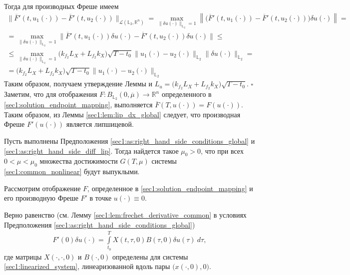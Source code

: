 \documentclass[../main.tex]{subfiles}
\begin{document}
Тогда для производных Фреше имеем
\begin{gather*}
	 \Big\| \overline{F}'(t, u_1(\cdot)) - \overline{F}'(t, u_2(\cdot)) \Big\|_{\mathcal{L}(\mathbb{L}_2, \mathbb{R}^n)} = 
	 \max\limits_{\|\delta u(\cdot)\|_{\mathbb{L}_2} = 1} \left\| \Big(  \overline{F}'(t, u_1(\cdot)) - \overline{F}'(t, u_2(\cdot)) \Big) \delta u(\cdot) \right\| = \\ =
	  \max\limits_{\|\delta u(\cdot)\|_{\mathbb{L}_2} = 1} \Big\| \overline{F}'(t, u_1(\cdot)) \delta u(\cdot) - \overline{F}'(t, u_2(\cdot)) \delta u(\cdot) \Big\| \leqslant \\ \leqslant  \max\limits_{\|\delta u(\cdot)\|_{\mathbb{L}_2} = 1} \Big( k_{f_2} L_X + L_{f_2} k_X \Big) \sqrt{T - t_0} \| u_1(\cdot) - u_2(\cdot) \|_{\mathbb{L}_2}  \| \delta u(\cdot) \|_{\mathbb{L}_2} = \\ =
	   \Big( k_{f_2} L_X + L_{f_2} k_X \Big) \sqrt{T - t_0} \| u_1(\cdot) - u_2(\cdot) \|_{\mathbb{L}_2}
\end{gather*}
Таким образом, получаем  утверждение Леммы и $L_u = \Big( k_{f_2} L_X + L_{f_2} k_X \Big) \sqrt{T - t_0} $.
\hfill$\square$\\[1ex]%
    
Заметим, что для отображения $F: B_{\mathbb{L}_2}(0,\overline{\mu}) \to \mathbb{R}^n$ определенного в \eqref{sec1:solution_endpoint_mapping}, выполняется $\overline{F}(T, u(\cdot)) = F(u(\cdot))$.
Таким образом, из Леммы \ref{sec1:lem:lip_dx_global} следует, что производная Фреше $F'(u(\cdot)) $ является липшицевой. 
    
\begin{theorem}\label{sec1:th:small_control_convexity}
    Пусть выполнены Предположения \ref{sec1:as:right_hand_side_conditions_global} и \ref{sec1:as:right_hand_side_diff_lip}.
    Тогда найдется такое $\mu_0 > 0$, что при всех $0 < \mu <  \mu_0 $ множества достижимости $G(T, \mu)$ системы \eqref{sec1:common_nonlinear} будут выпуклыми.
\end{theorem}
\doc
Рассмотрим отображение $F$, определенное в \eqref{sec1:solution_endpoint_mapping} и его производную Фреше $F'$ в точке $u(\cdot) \equiv 0$. 
    
Верно равенство (см.  Лемму \ref{sec1:lem:frechet_derivative_common} в условиях Предположения  \ref{sec1:as:right_hand_side_conditions_global})
\begin{gather*}
    F'(0) \delta u(\cdot) =  \int\limits_{t_0}^{T} X(t, \tau, 0) B(\tau, 0) \delta u(\tau) \ d\tau,
\end{gather*}
где матрицы $X(\cdot, \cdot, 0)$  и $B(\cdot, 0)$ определены для системы \eqref{sec1:linearized_system}, линеаризованной вдоль пары $\Big(x(\cdot, 0), 0\Big) $.
\end{document}
